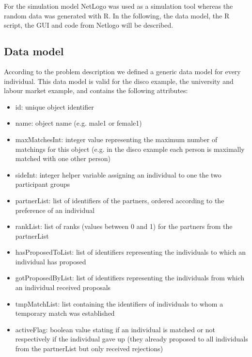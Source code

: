 \label{prototype}
For the simulation model NetLogo was used as a simulation tool whereas the random data was generated with R.
In the following, the data model, the R script, the GUI and code from Netlogo will be described.
\subsection{Data model}
According to the problem description we defined a generic data model for every individual.
This data model is valid for the disco example, the university and labour market example, and contains the following attributes:
\begin{itemize}
	\item id: unique object identifier
	\item name: object name (e.g. male1 or female1)
	\item maxMatchesInt: integer value representing the maximum number of matchings for this object (e.g. in the disco example each person is maximally matched with one other person)
	\item sideInt: integer helper variable assigning an individual to one the two participant groups
	\item partnerList: list of identifiers of the partners, ordered according to the preference of an individual
	\item rankList: list of ranks (values between 0 and 1) for the partners from the partnerList 
	\item hasProposedToList: list of identifiers representing the individuals to which an individual has proposed
	\item gotProposedByList: list of identifiers representing the individuals from which an individual received proposals
	\item tmpMatchList: list containing the identifiers of individuals to whom a temporary match was established
	\item activeFlag: boolean value stating if an individual is matched or not respectively if the individual gave up (they already proposed to all individuals from the partnerList but only received rejections)
\end{itemize}

